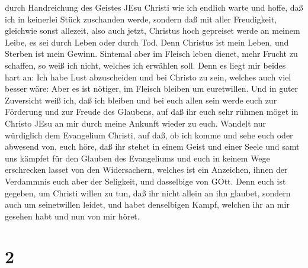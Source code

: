 durch Handreichung des Geistes JEsu Christi  wie ich
endlich warte und hoffe, daß ich in keinerlei Stück zuschanden werde,
sondern daß mit aller Freudigkeit, gleichwie sonst allezeit, also auch
jetzt, Christus hoch gepreiset werde an meinem Leibe, es sei durch Leben
oder durch Tod.  Denn Christus ist mein Leben, und Sterben
ist mein Gewinn.  Sintemal aber im Fleisch leben dienet,
mehr Frucht zu schaffen, so weiß ich nicht, welches ich erwählen soll.
 Denn es liegt mir beides hart an: Ich habe Lust
abzuscheiden und bei Christo zu sein, welches auch viel besser wäre:
 Aber es ist nötiger, im Fleisch bleiben um euretwillen.
 Und in guter Zuversicht weiß ich, daß ich bleiben und bei
euch allen sein werde euch zur Förderung und zur Freude des Glaubens,
 auf daß ihr euch sehr rühmen möget in Christo JEsu an mir
durch meine Ankunft wieder zu euch.  Wandelt nur würdiglich
dem Evangelium Christi, auf daß, ob ich komme und sehe euch oder
abwesend von, euch höre, daß ihr stehet in einem Geist und einer Seele
und samt uns kämpfet für den Glauben des Evangeliums  und
euch in keinem Wege erschrecken lasset von den Widersachern, welches ist
ein Anzeichen, ihnen der Verdammnis euch aber der Seligkeit, und
dasselbige von GOtt.  Denn euch ist gegeben, um Christi
willen zu tun, daß ihr nicht allein an ihn glaubet, sondern auch um
seinetwillen leidet,  und habet denselbigen Kampf, welchen
ihr an mir gesehen habt und nun von mir höret.

\hypertarget{section-1}{%
\section{2}\label{section-1}}

